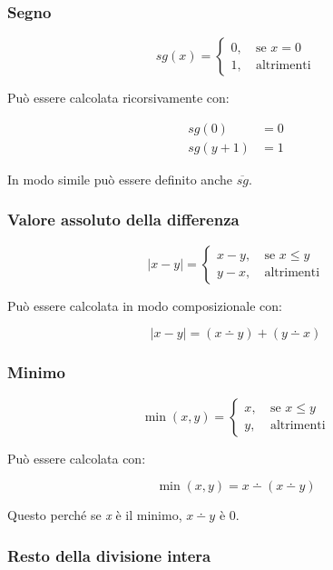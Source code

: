 \subsubsection{Segno}\label{segno}

$$sg(x) =\begin{cases}
0,\:& \text{se } x = 0\\
1, \:& \text{altrimenti}
\end{cases}$$

Può essere calcolata ricorsivamente con:

\begin{align*}
sg(0) &= 0 \\
sg(y+1) &= 1
\end{align*}

In modo simile può essere definito anche $\overline{sg}$.

\subsubsection{Valore assoluto della differenza}\label{valore-assoluto-della-differenza}

$$|x - y|=\begin{cases}
x-y,\:& \text{se } x \leq y\\
y-x, \:& \text{altrimenti}
\end{cases}$$

Può essere calcolata in modo composizionale con:

$$|x - y| = (x \dotminus y) + (y \dotminus x)$$


\subsubsection{Minimo}\label{minimo}

$$ \min (x,y) =\begin{cases}
x,\:& \text{se } x \leq y\\
y, \:& \text{altrimenti}
\end{cases}$$

Può essere calcolata con:

$$\min(x,y) = x \dotminus (x \dotminus y)$$

Questo perché se \emph{x} è il minimo, $x\dotminus y$ è 0.

\subsubsection{Resto della divisione intera}\label{resto-della-divisione-intera}

